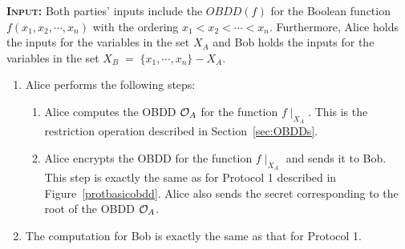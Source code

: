 \textsc{\bf Input:} Both parties' inputs include the $OBDD(f)$ for the Boolean function
$f(x_1,x_2,\cdots,x_n)$ with the ordering $x_1 < x_2 < \cdots < x_n$.
Furthermore, Alice holds the inputs for the variables in the set $X_A$ and
Bob holds the inputs for the variables in the set $X_B \; = \; \{ x_1,\cdots,x_n \} - X_A$.
\vspace{1ex}
\begin{enumerate}
\item Alice performs the following steps:
\begin{enumerate}
\item Alice computes the OBDD ${\cal O}_A$ for the function $f \mid_{X_A}$. This is the restriction
operation described in Section~\ref{sec:OBDDs}.

\item Alice encrypts the OBDD for the function $f \mid_{X_A}$ and sends it to Bob. This
step is exactly the same as for Protocol 1 described in Figure~\ref{protbasicobdd}. Alice also sends
the secret corresponding to the root of the OBDD ${\cal O}_A$. 


\end{enumerate}

\item The computation for Bob is exactly the same as that for Protocol 1. 

\end{enumerate}


